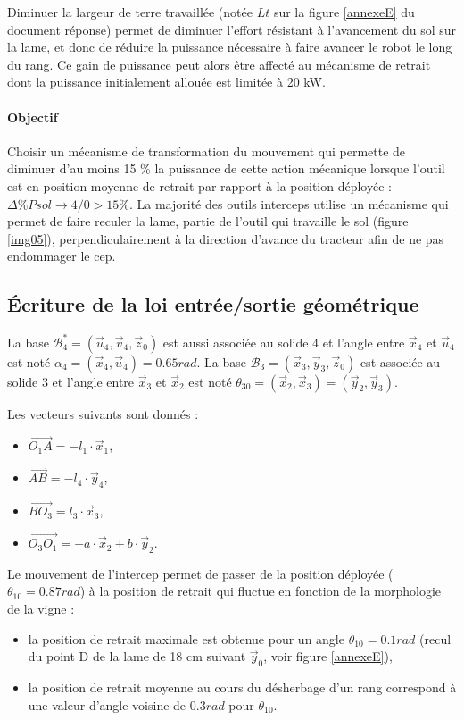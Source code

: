 Diminuer la largeur de terre travaillée (notée $Lt$ sur la figure \ref{annexeE} du document réponse) permet de diminuer l'effort résistant à l'avancement du sol sur la lame, et donc de réduire la puissance nécessaire à faire avancer le robot le long du rang. Ce gain de puissance peut alors être affecté au mécanisme de retrait dont la puissance initialement allouée est limitée à 20 kW.

\paragraph{Objectif}

Choisir un mécanisme de transformation du mouvement qui permette de diminuer d'au moins 15 \% la puissance de cette action mécanique lorsque l'outil est en position moyenne de retrait par rapport
à la position déployée : $\Delta\% P sol\rightarrow 4/0 > 15 \%$.
La majorité des outils interceps utilise un mécanisme qui permet de faire reculer la lame, partie de l'outil qui
travaille le sol (figure \ref{img05}), perpendiculairement à la direction d'avance du tracteur afin de ne pas endommager le
cep.

\subsection{Écriture de la loi entrée/sortie géométrique}

La base $\mathcal{B}^*_4=(\vec{u}_4,\vec{v}_4,\vec{z}_0)$ est aussi associée au solide 4 et l'angle entre $\vec{x}_4$ et $\vec{u}_4$ est noté $\alpha_4=(\vec{x}_4,\vec{u}_4)=0.65rad$. La base $\mathcal{B}_3=(\vec{x}_3,\vec{y}_3,\vec{z}_0)$ est associée au solide 3 et l'angle entre $\vec{x}_3$ et $\vec{x}_2$ est noté $\theta_{30}=(\vec{x}_2,\vec{x}_3)=(\vec{y}_2,\vec{y}_3)$.

Les vecteurs suivants sont donnés :
\begin{itemize}
 \item $\overrightarrow{O_1A}=-l_1\cdot\vec{x}_1$,
 \item $\overrightarrow{AB}=-l_4\cdot\vec{y}_4$,
 \item $\overrightarrow{BO_3}=l_3\cdot\vec{x}_3$,
 \item $\overrightarrow{O_3O_1}=-a\cdot\vec{x}_2+b\cdot\vec{y}_2$.
\end{itemize}

Le mouvement de l'intercep permet de passer de la position déployée ($\theta_{10}=0.87rad$) à la position de retrait qui fluctue en fonction de la morphologie de la vigne :
\begin{itemize}
 \item la position de retrait maximale est obtenue pour un angle 
$\theta_{10}=0.1 rad$ (recul du point D de la lame de 18 cm suivant $\vec{y}_0$, voir figure \ref{annexeE}),
 \item la position de retrait moyenne au cours du désherbage d'un rang correspond à une valeur d'angle voisine de $0.3rad$ pour $\theta_{10}$.
\end{itemize}

